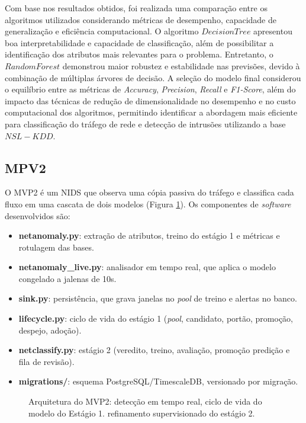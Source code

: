 \documentclass[a4paper,10pt, twocolumn]{article}
\begin{document}
Com base nos resultados obtidos, foi realizada uma comparação entre os algoritmos 
utilizados considerando métricas de desempenho, capacidade de generalização e 
eficiência computacional. O algoritmo \textit{$Decision Tree$} apresentou boa interpretabilidade 
e capacidade de classificação, além de possibilitar a identificação dos 
atributos mais relevantes para o problema. Entretanto, o \textit{$Random Forest$} demonstrou maior 
robustez e estabilidade nas previsões, devido à combinação de múltiplas 
árvores de decisão. A seleção do modelo final considerou o equilíbrio entre as 
métricas de \textit{Accuracy}, \textit{Precision}, \textit{Recall} e \textit{F1-Score}, além do impacto das técnicas de 
redução de dimensionalidade no desempenho e no custo computacional dos algoritmos, 
permitindo identificar a abordagem mais eficiente para classificação do tráfego 
de rede e detecção de intrusões utilizando a base $NSL-KDD$. 

\subsection{MPV2}
O MVP2 é um NIDS que observa uma cópia passiva do tráfego e classifica cada fluxo
em uma cascata de dois modelos (Figura \ref{fig:arquitetura}). Os componentes de
\textit{software} desenvolvidos são:
\begin{itemize}
	\item \textbf{netanomaly.py}: extração de atributos, treino do estágio 1 e métricas e rotulagem das bases.
	\item \textbf{netanomaly\_live.py}: analisador em tempo real, que aplica o modelo congelado a jalenas de 10s.
	\item \textbf{sink.py}: persistência, que grava janelas no \textit{pool} de treino e alertas no banco.
	\item \textbf{lifecycle.py}: ciclo de vida do estágio 1 (\textit{pool}, candidato, portão, promoção, despejo, adoção).
	\item \textbf{netclassify.py}: estágio 2 (veredito, treino, avaliação, promoção predição e fila de revisão).
	\item \textbf{migrations/}: esquema PostgreSQL/TimescaleDB, versionado por migração.
\end{itemize}

\begin{strip}
\begin{figure}[H]
  \centering
  \resizebox{\textwidth}{!}{}
  \caption{Arquitetura do MVP2: detecção em tempo real, ciclo de vida do modelo do Estágio 1. refinamento supervisionado do estágio 2.}
  \label{fig:arquitetura}
\end{figure}
\end{strip}
\end{document}
